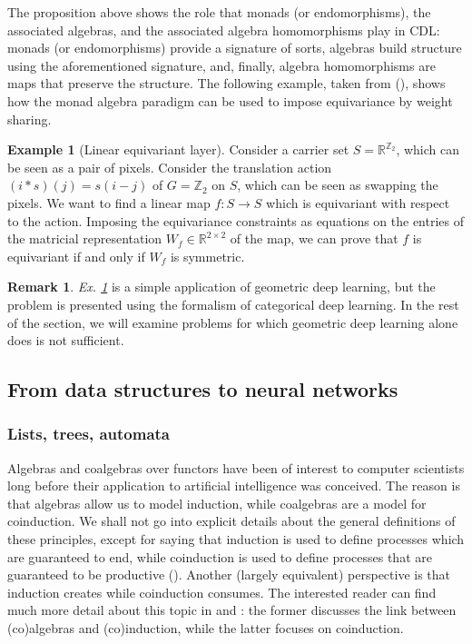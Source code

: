\documentclass[12pt,a4paper,openright,twoside]{report}
\theoremstyle{plain}
\theoremstyle{definition}
\newtheorem{remark}[proposition]{Remark}
\newtheorem{example}[proposition]{Example}
\begin{document}
The proposition above shows the role that monads (or endomorphisms), the associated algebras, and the associated algebra homomorphisms play in CDL: monads (or endomorphisms) provide a signature of sorts, algebras build structure using the aforementioned signature, and, finally, algebra homomorphisms are maps that preserve the structure. The following example, taken from (\cite{gavranovicposition}), shows how the monad algebra paradigm can be used to impose equivariance by weight sharing.

\begin{example}[Linear equivariant layer]
  \label{ex: translationaction}
  Consider a carrier set $S = \mathbb{R}^{\mathbb{Z}_2}$, which can be seen as a pair of pixels. Consider the translation action $(i \ast s)(j) = s(i-j)$ of $G = \mathbb{Z}_2$ on $S$, which can be seen as swapping the pixels.
  We want to find a linear map $f: S \to S$ which is equivariant with respect to the action. Imposing the equivariance constraints as equations on the entries of the matricial representation $W_f \in \mathbb{R}^{2 \times 2}$ of the map, we can prove that $f$ is equivariant if and only if $W_f$ is symmetric.
\end{example}

\begin{remark}
  \textit{Ex. \ref{ex: translationaction}} is a simple application of geometric deep learning, but the problem is presented using the formalism of categorical deep learning. In the rest of the section, we will examine problems for which geometric deep learning alone does is not sufficient.
\end{remark}


\subsection{From data structures to neural networks}

\subsubsection{Lists, trees, automata}

Algebras and coalgebras over functors have been of interest to computer scientists long before their application to artificial intelligence was conceived. The reason is that algebras allow us to model induction, while coalgebras are a model for coinduction. We shall not go into explicit details about the general definitions of these principles, except for saying that induction is used to define processes which are guaranteed to end, while coinduction is used to define processes that are guaranteed to be productive (\cite{gavranovicposition}). Another (largely equivalent) perspective is that induction creates while coinduction consumes. The interested reader can find much more detail about this topic in \cite{jacobs1997tutorial} and \cite{kozen2017practical}: the former discusses the link between (co)algebras and (co)induction, while the latter focuses on coinduction. 
\end{document}
